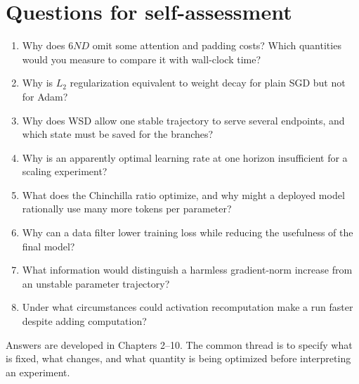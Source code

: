 \section{Questions for self-assessment}
\begin{enumerate}
\item Why does $6ND$ omit some attention and padding costs? Which quantities would you measure to compare it with wall-clock time?
\item Why is $L_2$ regularization equivalent to weight decay for plain SGD but not for Adam?
\item Why does WSD allow one stable trajectory to serve several endpoints, and which state must be saved for the branches?
\item Why is an apparently optimal learning rate at one horizon insufficient for a scaling experiment?
\item What does the Chinchilla ratio optimize, and why might a deployed model rationally use many more tokens per parameter?
\item Why can a data filter lower training loss while reducing the usefulness of the final model?
\item What information would distinguish a harmless gradient-norm increase from an unstable parameter trajectory?
\item Under what circumstances could activation recomputation make a run faster despite adding computation?
\end{enumerate}

Answers are developed in Chapters 2--10. The common thread is to specify what is fixed, what changes, and what quantity is being optimized before interpreting an experiment.
